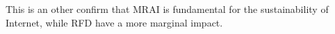 This is an other confirm that \ac{MRAI} is fundamental for the sustainability of
Internet, while \ac{RFD} have a more marginal impact.

